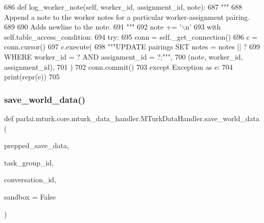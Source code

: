 \begin{DoxyCode}
686     \textcolor{keyword}{def }log\_worker\_note(self, worker\_id, assignment\_id, note):
687         \textcolor{stringliteral}{"""}
688 \textcolor{stringliteral}{        Append a note to the worker notes for a particular worker-assignment pairing.}
689 \textcolor{stringliteral}{}
690 \textcolor{stringliteral}{        Adds newline to the note.}
691 \textcolor{stringliteral}{        """}
692         note += \textcolor{stringliteral}{'\(\backslash\)n'}
693         with self.table\_access\_condition:
694             \textcolor{keywordflow}{try}:
695                 conn = self.\_get\_connection()
696                 c = conn.cursor()
697                 c.execute(
698                     \textcolor{stringliteral}{"""UPDATE pairings SET notes = notes || ?}
699 \textcolor{stringliteral}{                             WHERE worker\_id = ? AND assignment\_id = ?;"""},
700                     (note, worker\_id, assignment\_id),
701                 )
702                 conn.commit()
703             \textcolor{keywordflow}{except} Exception \textcolor{keyword}{as} e:
704                 print(repr(e))
705 
\end{DoxyCode}
\mbox{\label{classparlai_1_1mturk_1_1core_1_1mturk__data__handler_1_1MTurkDataHandler_a500ef3c8e0c9b94d7759436da43a1a62}} 
\subsubsection{\texorpdfstring{save\+\_\+world\+\_\+data()}{save\_world\_data()}}
{\footnotesize\ttfamily def parlai.\+mturk.\+core.\+mturk\+\_\+data\+\_\+handler.\+M\+Turk\+Data\+Handler.\+save\+\_\+world\+\_\+data (\begin{DoxyParamCaption}\item[{}]{prepped\+\_\+save\+\_\+data,  }\item[{}]{task\+\_\+group\+\_\+id,  }\item[{}]{conversation\+\_\+id,  }\item[{}]{sandbox = {\ttfamily False} }\end{DoxyParamCaption})\hspace{0.3cm}{\ttfamily [static]}}



